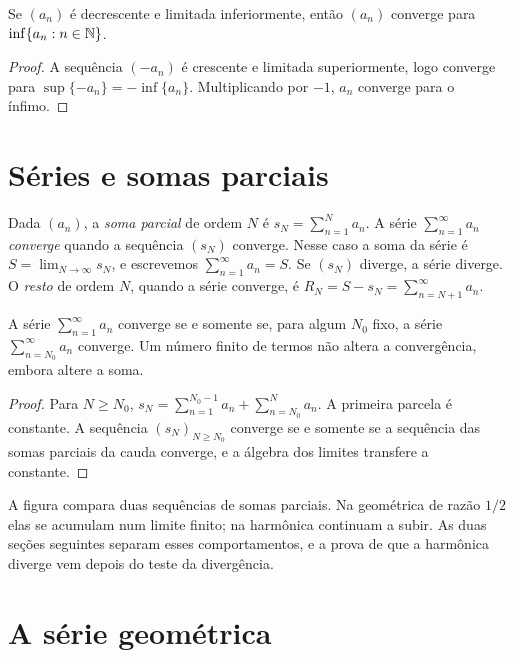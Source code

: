 \documentclass[11pt,a4paper]{article}
\begin{document}
\begin{corolario}
Se \((a_n)\) é decrescente e limitada inferiormente, então \((a_n)\) converge para \(\inf\{a_n:n\in\mathbb{N}\}\).
\end{corolario}

\begin{proof}
A sequência \((-a_n)\) é crescente e limitada superiormente, logo converge para \(\sup\{-a_n\}=-\inf\{a_n\}\). Multiplicando por \(-1\), \(a_n\) converge para o ínfimo.
\end{proof}

\section{Séries e somas parciais}

\begin{definicao}
Dada \((a_n)\), a \emph{soma parcial} de ordem \(N\) é \(s_N=\sum_{n=1}^N a_n\). A série \(\sum_{n=1}^\infty a_n\) \emph{converge} quando a sequência \((s_N)\) converge. Nesse caso a soma da série é \(S=\lim_{N\to\infty}s_N\), e escrevemos \(\sum_{n=1}^\infty a_n=S\). Se \((s_N)\) diverge, a série diverge. O \emph{resto} de ordem \(N\), quando a série converge, é \(R_N=S-s_N=\sum_{n=N+1}^\infty a_n\).
\end{definicao}

\begin{proposicao}
A série \(\sum_{n=1}^\infty a_n\) converge se e somente se, para algum \(N_0\) fixo, a série \(\sum_{n=N_0}^\infty a_n\) converge. Um número finito de termos não altera a convergência, embora altere a soma.
\end{proposicao}

\begin{proof}
Para \(N\ge N_0\), \(s_N=\sum_{n=1}^{N_0-1}a_n+\sum_{n=N_0}^N a_n\). A primeira parcela é constante. A sequência \((s_N)_{N\ge N_0}\) converge se e somente se a sequência das somas parciais da cauda converge, e a álgebra dos limites transfere a constante.
\end{proof}


A figura compara duas sequências de somas parciais. Na geométrica de razão \(1/2\) elas se acumulam num limite finito; na harmônica continuam a subir. As duas seções seguintes separam esses comportamentos, e a prova de que a harmônica diverge vem depois do teste da divergência.

\section{A série geométrica}
\end{document}
